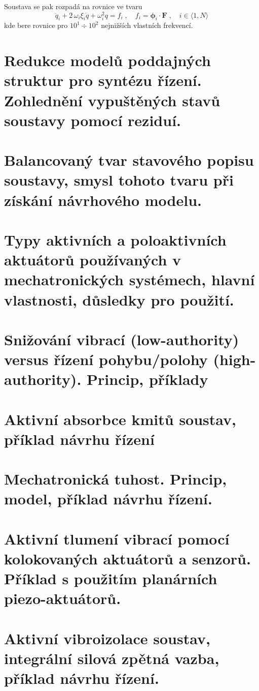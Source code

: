\documentclass{article}
\begin{document}
	Soustava se pak rozpadá na rovnice ve tvaru
	\begin{equation*}
		\ddot{q}_i + 2\,\omega_i\xi_i \dot{q} + \omega_i^2 q = f_i
		\;,\quad 
		f_i = \bm{\phi}_i \cdot \bm{F}
		\;,\quad 
		i \in \langle 1,N \rangle
	\end{equation*}
	kde bere rovnice pro $10^1 \div 10^2$ nejnižších vlastních frekvencí.

	\section{Redukce modelů poddajných struktur pro syntézu řízení. Zohlednění vypuštěných stavů soustavy pomocí reziduí.}

	\section{Balancovaný tvar stavového popisu soustavy, smysl tohoto tvaru při získání návrhového modelu.}

	\section{Typy aktivních a poloaktivních aktuátorů používaných v mechatronických systémech, hlavní vlastnosti, důsledky pro použití.}

	\section{Snižování vibrací (low-authority) versus řízení pohybu/polohy (high-authority). Princip, příklady}

	\section{Aktivní absorbce kmitů soustav, příklad návrhu řízení}

	\section{Mechatronická tuhost. Princip, model, příklad návrhu řízení.}

	\section{Aktivní tlumení vibrací pomocí kolokovaných aktuátorů a senzorů. Příklad s použitím planárních piezo-aktuátorů.}

	\section{Aktivní vibroizolace soustav, integrální silová zpětná vazba, příklad návrhu řízení.}
\end{document}
